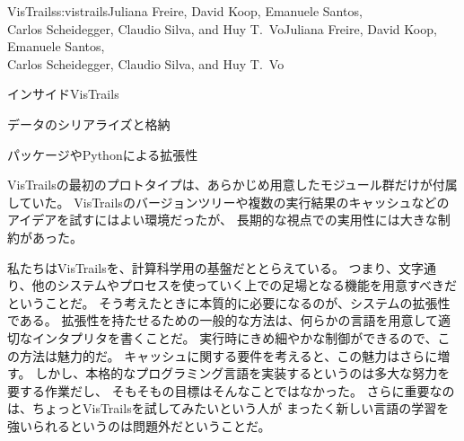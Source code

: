 \begin{aosachaptertoc}{VisTrails}{s:vistrails}{Juliana Freire, David Koop, Emanuele Santos, \\ Carlos Scheidegger, Claudio Silva, and Huy T.\ Vo}{Juliana Freire, David Koop, Emanuele Santos, \\ \hspace*{0.9cm} Carlos Scheidegger, Claudio Silva, and Huy T.\ Vo}
\begin{aosasect1}{インサイドVisTrails}
\begin{aosasect2}{データのシリアライズと格納}
\end{aosasect2}

\begin{aosasect2}{パッケージやPythonによる拡張性}
\label{sec.vistrails.packages}

VisTrailsの最初のプロトタイプは、あらかじめ用意したモジュール群だけが付属していた。
VisTrailsのバージョンツリーや複数の実行結果のキャッシュなどのアイデアを試すにはよい環境だったが、
長期的な視点での実用性には大きな制約があった。

私たちはVisTrailsを、計算科学用の基盤だととらえている。
つまり、文字通り、他のシステムやプロセスを使っていく上での足場となる機能を用意すべきだということだ。
そう考えたときに本質的に必要になるのが、システムの拡張性である。
拡張性を持たせるための一般的な方法は、何らかの言語を用意して適切なインタプリタを書くことだ。
実行時にきめ細やかな制御ができるので、この方法は魅力的だ。
キャッシュに関する要件を考えると、この魅力はさらに増す。
しかし、本格的なプログラミング言語を実装するというのは多大な努力を要する作業だし、
そもそもの目標はそんなことではなかった。
さらに重要なのは、ちょっとVisTrailsを試してみたいという人が
まったく新しい言語の学習を強いられるというのは問題外だということだ。


\end{aosasect2}
\end{aosasect1}
\end{aosachaptertoc}
